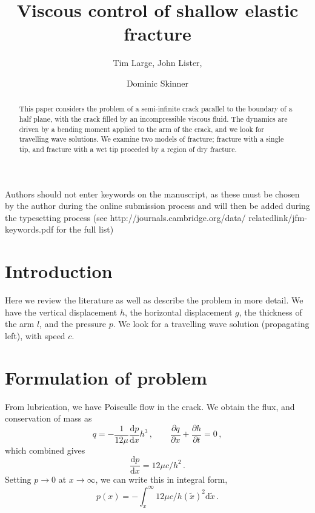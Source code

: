 \documentclass{jfm}
\title{Viscous control of shallow elastic fracture}
\author{Tim Large\aff{1},
  John Lister\aff{2},
 \and Dominic Skinner\aff{2}}
\affiliation{\aff{1} M.I.T., USA
\aff{2}Department of Applied Mathematics and Theoretical Physics, University of
Cambridge, UK}
\newcommand{\mrd}{\mathrm{d}}
\begin{document}
\maketitle

\begin{abstract}
This paper considers the problem of a semi-infinite crack parallel to the
boundary of a half plane, with the crack filled by an incompressible viscous
fluid. 
The dynamics are driven by a bending moment applied to the arm of the crack,
and we look for travelling wave solutions. We examine two models of fracture;
fracture with a single tip, and fracture with a wet tip proceded by a region
of dry fracture.
\end{abstract}

\begin{keywords}
Authors should not enter keywords on the manuscript, as these must be chosen by the 
author during the online submission process and will then be added during the 
typesetting process (see http://journals.cambridge.org/data/
\linebreak[3]relatedlink/jfm-\linebreak[3]keywords.pdf for the full list)
\end{keywords}

\section{Introduction}\label{sec:introduction}
Here we review the literature as well as describe the problem in more detail.
We have the vertical displacement $h$, the horizontal displacement $g$, the
thickness of the arm $l$, and the pressure $p$.
We look for a travelling wave solution (propagating left), with speed $c$.
%
% 
\section{Formulation of problem}\label{sec:formulation_of_problem}
%
%
From lubrication, we have Poiseulle flow in the crack. We obtain
the flux, and conservation of mass as 
\begin{equation}
q = - \frac{1}{12\mu}\frac{\mrd p}{\mrd x}h^3 \, , \qquad
\frac{\partial q}{\partial x} + \frac{\partial h}{\partial t} = 0 \, ,
\end{equation}
which combined gives
\begin{equation}
\frac{\mrd p}{\mrd x} = 12\mu c / h^2 \, .
\end{equation}
Setting $p\to 0$ at $x \to \infty$, we can write this in integral form,
\begin{equation}
p(x) = -\int_x^{\infty} 12\mu c / h(\tilde{x})^2 \mrd \tilde{x} \, .
\end{equation}
\end{document}
